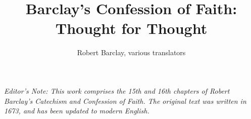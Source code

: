


\title{Barclay's Confession of Faith: Thought for Thought}
\author{Robert Barclay, various translators}


	
	\maketitle

	\textit{Editor's Note: This work comprises the 15th and 16th chapters of Robert Barclay's Catechism and Confession of Faith. The original text was written in 1673, and has been updated to modern English.}

	
	\tableofcontents
	
	
	
	



